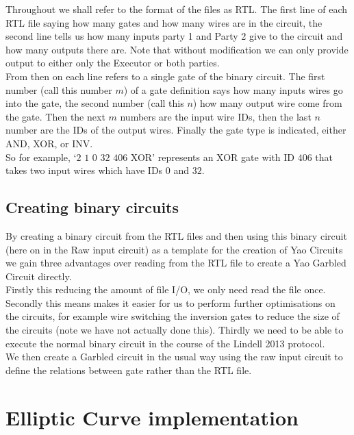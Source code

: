 \documentclass[ %
                    author={Nicholas Tutte},
                supervisor={Prof. Nigel Smart},
                    degree={MEng},
                     title={Secure Two Party Computation},
                  subtitle={A practical comparison of recent protocols},
                      type={Research - GG1K},
                      year={2015} ]{dissertation}
\begin{document}
\begin{appendices}
					Throughout we shall refer to the format of the files as RTL. The first line of each RTL file saying how many gates and how many wires are in the circuit, the second line tells us how many inputs party 1 and Party 2 give to the circuit and how many outputs there are. Note that without modification we can only provide output to either only the Executor or both parties.\\

					From then on each line refers to a single gate of the binary circuit. The first number (call this number $m$) of a gate definition says how many inputs wires go into the gate, the second number (call this $n$) how many output wire come from the gate. Then the next $m$ numbers are the input wire IDs, then the last $n$ number are the IDs of the output wires. Finally the gate type is indicated, either AND, XOR, or INV.\\

					So for example, `$2$ $1$ $0$ $32$ $406$ XOR' represents an XOR gate with ID $406$ that takes two input wires which have IDs $0$ and $32$.

				\subsection{Creating binary circuits}
					By creating a binary circuit from the RTL files and then using this binary circuit (here on in the Raw input circuit) as a template for the creation of Yao Circuits we gain three advantages over reading from the RTL file to create a Yao Garbled Circuit directly.\\

					Firstly this reducing the amount of file I/O, we only need read the file once. Secondly this means makes it easier for us to perform further optimisations on the circuits, for example wire switching the inversion gates to reduce the size of the circuits (note we have not actually done this). Thirdly we need to be able to execute the normal binary circuit in the course of the Lindell 2013 protocol.\\

					We then create a Garbled circuit in the usual way using the raw input circuit to define the relations between gate rather than the RTL file.

			\section{Elliptic Curve implementation}


\end{appendices}
\end{document}

